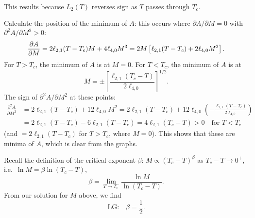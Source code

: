 \begin{diagram}
\end{diagram}

This results because $L_2(T)$ reverses sign as $T$ passes through $T_c$.

Calculate the position of the minimum of $A$: this occurs where $\partial A/\partial M = 0$ with
$\partial^2A/\partial M^2>0$:
\begin{equation}
  \frac{\partial A}{\partial M} = 2\ell_{2,1}(T-T_c)M + 4\ell_{4,0}M^3 = 2M\left[\ell_{2,1}(T-T_c) + 2\ell_{4,0}M^2\right].
\end{equation}
For $T>T_c$, the minimum of $A$ is at $M = 0$. For $T<T_c$, the minimum of $A$ is at
\begin{equation}
  M = \pm\left[\frac{\ell_{2,1}(T_c-T)}{2\ell_{4,0}}\right]^{1/2}.
\end{equation}
The sign of $\partial^2A/\partial M^2$ at these points:
\begin{align}
  \frac{\partial^2A}{\partial M^2} &= 2\ell_{2,1}(T-T_c) + 12\ell_{4,0}M^2
    = 2\ell_{2,1}(T-T_c) + 12\ell_{4,0}\left(-\frac{\ell_{2,1}(T-T_c)}{2\ell_{4,0}}\right)\nonumber\\
  &= 2\ell_{2,1}(T-T_c) - 6\ell_{2,1}(T-T_c) = 4\ell_{2,1}(T_c-T)>0\quad\text{for } T<T_c
\end{align}
(and $=2\ell_{2,1}(T-T_c)$ for $T>T_c$, where $M = 0$). This shows that these are minima of $A$,
which is clear from the graphs.

Recall the definition of the critical exponent $\beta$: $M\propto(T_c-T)^\beta$ as
$T_c-T\to 0^+$, i.e.\ $\ln M = \beta\ln(T_c-T)$,
\begin{equation}
  \beta = \lim_{T\to T_c^-}\frac{\ln M}{\ln(T_c-T)}.
\end{equation}
From our solution for $M$ above, we find
\begin{equation}
  \text{LG:}\quad\boxed{\beta = \frac{1}{2}}.
\end{equation}

